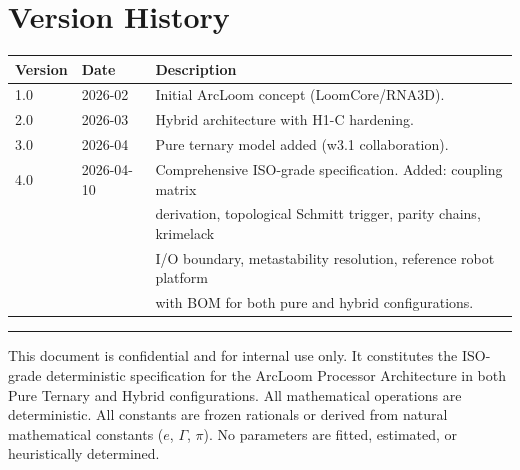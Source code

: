 \documentclass[11pt, a4paper]{article}
\begin{document}
\section{Version History}

\begin{center}
\begin{tabular}{@{}lll@{}}
\toprule
\textbf{Version} & \textbf{Date} & \textbf{Description} \\
\midrule
1.0 & 2026-02 & Initial ArcLoom concept (LoomCore/RNA3D). \\
2.0 & 2026-03 & Hybrid architecture with H1-C hardening. \\
3.0 & 2026-04 & Pure ternary model added (w3.1 collaboration). \\
4.0 & 2026-04-10 & Comprehensive ISO-grade specification. Added: coupling matrix \\
    &            & derivation, topological Schmitt trigger, parity chains, krimelack \\
    &            & I/O boundary, metastability resolution, reference robot platform \\
    &            & with BOM for both pure and hybrid configurations. \\
\bottomrule
\end{tabular}
\end{center}

\vspace{2em}
\hrule
\vspace{0.5em}
{\color{al-gray}\small This document is confidential and for internal use only.
It constitutes the ISO-grade deterministic specification for the ArcLoom
Processor Architecture in both Pure Ternary and Hybrid configurations.
All mathematical operations are deterministic. All constants are frozen
rationals or derived from natural mathematical constants ($e$, $\Gamma$,
$\pi$). No parameters are fitted, estimated, or heuristically determined.}
\end{document}
